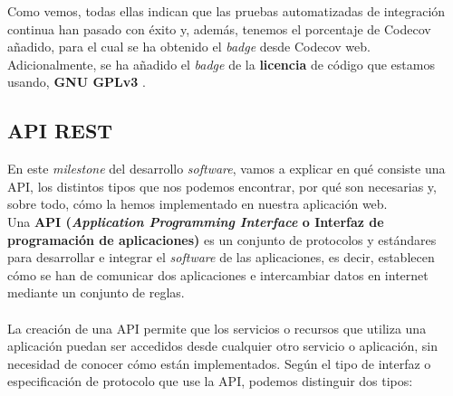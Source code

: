 Como vemos, todas ellas indican que las pruebas automatizadas de integración continua han
pasado con éxito y, además, tenemos el porcentaje de Codecov añadido, para el cual se ha
obtenido el \textit{badge} desde Codecov web. Adicionalmente, se ha añadido el
\textit{badge} de la \textbf{licencia} de código que estamos usando, \textbf{GNU GPLv3}
\cite{gplv3}.

\newpage \subsection{API REST}
En este \textit{milestone} del desarrollo \textit{software}, vamos a explicar en qué
consiste una API, los distintos tipos que nos podemos encontrar, por qué son necesarias y,
sobre todo, cómo la hemos implementado en nuestra aplicación web.\\

Una \textbf{API \cite{api} (\textit{Application Programming Interface} o Interfaz de
programación de aplicaciones)} es un conjunto de protocolos y estándares para desarrollar e
integrar el \textit{software} de las aplicaciones, es decir, establecen cómo se han de
comunicar dos aplicaciones e intercambiar datos en internet mediante un conjunto de reglas.\\ \\

La creación de una API permite que los servicios o recursos que utiliza una aplicación
puedan ser accedidos desde cualquier otro servicio o aplicación, sin necesidad de
conocer cómo están implementados. Según el tipo de interfaz o especificación de protocolo
que use la API, podemos distinguir dos tipos:

